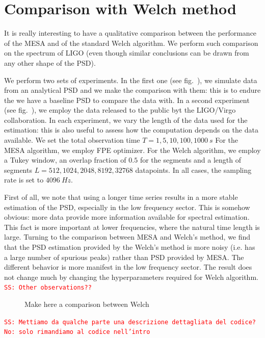 \documentclass[twocolumn,showpacs,preprintnumbers,nofootinbib,prd,
superscriptaddress,10pt]{revtex4-1}
\newcommand{\sschmidt}[1]{{\textcolor{red}{\texttt{SS: #1}} }}
\begin{document}
\section{Comparison with Welch method}

It is really interesting to have a qualitative comparison between the performance of the MESA and of the standard Welch algorithm.
We perform such comparison on the spectrum of LIGO (even though similar conclusions can be drawn from any other shape of the PSD).

We perform two sets of experiments.
In the first one (see fig.~), we simulate data from an analytical PSD and we make the comparison with them: this is to endure the we have a baseline PSD to compare the data with.
In a second experiment (see fig.~), we employ the data released to the public byt the LIGO/Virgo collaboration.
In each experiment, we vary the length of the data used for the estimation: this is also useful to assess how the computation depends on the data available. We set the total observation time $T = 1, 5, 10, 100, 1000 \SI{}{s}$
For the MESA algorithm, we employ FPE optimizer. For the Welch algorithm, we employ a Tukey window, an overlap fraction of $0.5$ for the segments and a length of segments $L = 512, 1024, 2048, 8192, 32768$ datapoints.
In all cases, the sampling rate is set to $\SI{4096}{Hz}$.

First of all, we note that using a longer time series results in a more stable estimation of the PSD, especially in the low frequency sector. This is somehow obvious: more data provide more information available for spectral estimation. This fact is more important at lower frequencies, where the natural time length is large.
Turning to the comparison between MESA and Welch's method, we find that the PSD estimation provided by the Welch's method is more noisy (i.e. has a large number of spurious peaks) rather than PSD provided by MESA. The different behavior is more manifest in the low frequency sector.
The result does not change much by changing the hyperparameters required for Welch algorithm.
\sschmidt{Other observations??}


\begin{figure}
	
	\label{fig:mem_welch_realdata}
	\caption{Make here a comparison between Welch}
	
\end{figure}

\sschmidt{Mettiamo da qualche parte una descrizione dettagliata del codice? No: solo rimandiamo al codice nell'intro}
\end{document}
